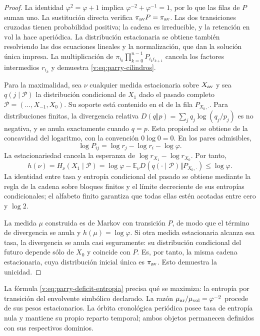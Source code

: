 \begin{proof}
La identidad \(\varphi^2=\varphi+1\) implica
\(\varphi^{-2}+\varphi^{-1}=1\), por lo que las filas de \(P\)
suman uno. La sustitución directa verifica
\(\pi_{\rm av}P=\pi_{\rm av}\). Las dos transiciones cruzadas
tienen probabilidad positiva; la cadena es irreducible, y la retención
en \(\mathrm{vol}\) la hace aperiódica. La distribución estacionaria
se obtiene también resolviendo las dos ecuaciones lineales y la
normalización, que dan la solución única impresa. La multiplicación de
\(\pi_{i_0}\prod_{k=0}^{n-1}P_{i_k i_{k+1}}\) cancela los factores
intermedios \(r_{i_k}\) y demuestra \eqref{v:eq:parry-cilindros}.

Para la maximalidad, sea \(\nu\) cualquier medida estacionaria
sobre \(X_{\rm av}\) y sea
\(q(j\mid\mathcal P)\) la distribución condicional de \(X_1\)
dado el pasado completo \(\mathcal P=(\ldots,X_{-1},X_0)\).
Su soporte está contenido en el de la fila \(P_{X_0,\cdot}\).
Para distribuciones finitas, la divergencia relativa
\(D(q\Vert p)=\sum_jq_j\log(q_j/p_j)\) es no negativa, y se
anula exactamente cuando \(q=p\). Esta propiedad se obtiene de
la concavidad del logaritmo, con la convención \(0\log0=0\).
En los pares admisibles,
\[
 \log P_{ij}=\log r_j-\log r_i-\log\varphi.
\]
La estacionariedad cancela la esperanza de
\(\log r_{X_1}-\log r_{X_0}\). Por tanto,
\begin{equation}
 h(\nu)=H_\nu(X_1\mid\mathcal P)
 =\log\varphi-
 \mathbb E_\nu D\!\left(q(\cdot\mid\mathcal P)
                  \Vert P_{X_0,\cdot}\right)
 \leq\log\varphi.
 \label{v:eq:parry-deficit-entropia}
\end{equation}
La identidad entre tasa y entropía condicional del pasado se obtiene
mediante la regla de la cadena sobre bloques finitos y el límite
decreciente de sus entropías condicionales; el alfabeto finito garantiza
que todas ellas estén acotadas entre cero y \(\log2\).

La medida \(\mu\) construida es de Markov con transición \(P\),
de modo que el término de divergencia se anula y
\(h(\mu)=\log\varphi\). Si otra medida estacionaria alcanza
esa tasa, la divergencia se anula casi seguramente: su distribución
condicional del futuro depende sólo de \(X_0\) y coincide con \(P\).
Es, por tanto, la misma cadena estacionaria, cuya distribución inicial
única es \(\pi_{\rm av}\). Esto demuestra la unicidad.
\end{proof}

La fórmula \eqref{v:eq:parry-deficit-entropia} precisa qué se maximiza:
la entropía por transición del envolvente simbólico declarado. La razón
\(\mu_{\rm ar}/\mu_{\rm vol}=\varphi^{-2}\) procede de sus pesos
estacionarios. La órbita cronológica periódica posee tasa de entropía
nula y mantiene su propio reparto temporal; ambos objetos permanecen
definidos con sus respectivos dominios.
